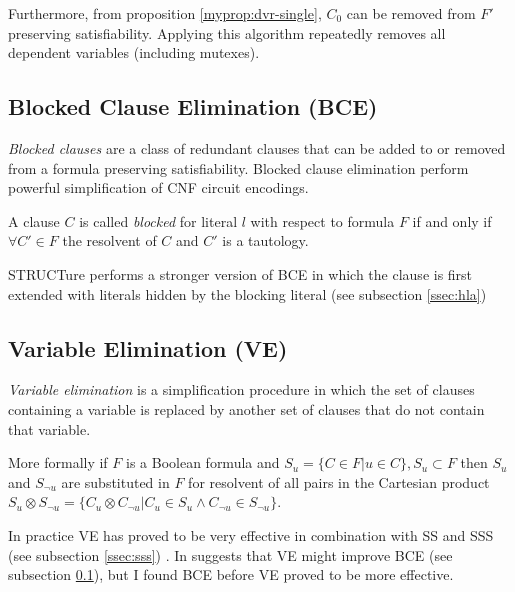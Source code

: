 Furthermore, from proposition \ref{myprop:dvr-single}, $C_0$ can be
removed from $F'$ preserving satisfiability. Applying this algorithm
repeatedly removes all dependent variables (including mutexes).


\subsection{Blocked Clause Elimination (BCE)}
\label{ssec:bce}

\emph{Blocked clauses} are a class of redundant clauses
that can be added to \cite{Kullmann:1999:NMD:312269.312271} or
removed from \cite{Jarvisalo_blockedclause} a formula preserving
satisfiability. Blocked clause elimination perform powerful
simplification of CNF circuit encodings.

\begin{mydef} A clause $C$ is called \emph{blocked}
for literal $l$ with respect to formula $F$ if and only if $\forall
C' \in F$ the resolvent of $C$ and $C'$ is a tautology.
\end{mydef}

STRUCTure performs a stronger version of BCE in which the clause
is first extended with literals hidden by the blocking literal
(see subsection \ref{ssec:hla}) \cite{Heule_coveredclause.}


\subsection{Variable Elimination (VE)}
\label{ssec:ve}

\emph{Variable elimination} is a simplification procedure
in which the set of clauses containing a variable is
replaced by another set of clauses that do not contain that
variable\cite{Een05effectivepreprocessing}.

More formally if $F$ is a Boolean formula and $S_u = \{ C \in F | u
\in C \},S_u \subset F$ then $S_u$ and $S_{\neg u}$ are substituted
in $F$ for resolvent of all pairs in the Cartesian product $S_u
\otimes S_{\neg u} = \{ C_u \otimes C_{\neg u} | C_u \in S_u \land
C_{\neg u} \in S_{\neg u}\}$.

In practice VE has proved to be very effective in
combination with SS and SSS (see subsection \ref{ssec:sss})
\cite{Een05effectivepreprocessing}. In \cite{Jarvisalo_blockedclause}
suggests that VE might improve BCE (see subsection \ref{ssec:bce}),
but I found BCE before VE proved to be more effective.
